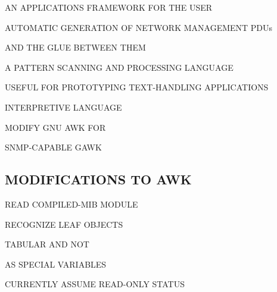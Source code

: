 \begin{bwslide}

\begin{nrtc}
\item	AN APPLICATIONS FRAMEWORK FOR THE USER

\item	AUTOMATIC GENERATION OF NETWORK MANAGEMENT PDUs
    \begin{nrtc}
    \item	AND THE GLUE BETWEEN THEM    
    \end{nrtc}
\end{nrtc}
\end{bwslide}


\begin{bwslide}

\begin{nrtc}
\item	A PATTERN SCANNING AND PROCESSING LANGUAGE

\item	USEFUL FOR PROTOTYPING TEXT-HANDLING APPLICATIONS

\item	INTERPRETIVE LANGUAGE

\item	MODIFY GNU AWK FOR
    \begin{nrtc}
    \item	SNMP-CAPABLE GAWK
    \end{nrtc}
\end{nrtc}
\end{bwslide}


\begin{bwslide}
\part*	{MODIFICATIONS TO AWK}\bf

\begin{nrtc}
\item	READ COMPILED-MIB MODULE

\item	RECOGNIZE LEAF OBJECTS
    \begin{nrtc}
    \item	TABULAR AND NOT
    \end{nrtc}
	AS SPECIAL VARIABLES

\item	CURRENTLY ASSUME READ-ONLY STATUS
\end{nrtc}
\end{bwslide}


